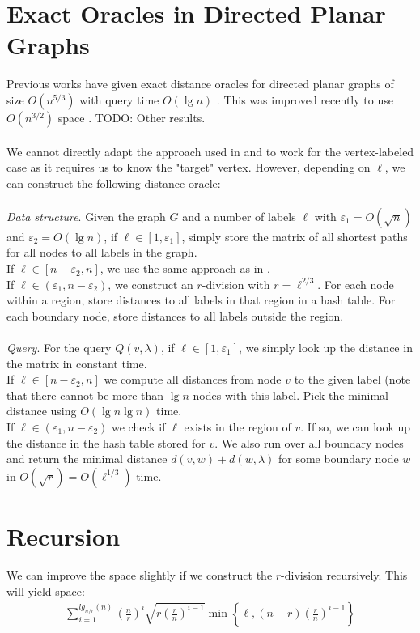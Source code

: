 \section{Exact Oracles in Directed Planar Graphs}
\label{sec:sota}
Previous works have given exact distance oracles for directed planar graphs of size
$O(n^{5/3})$ with query time $O(\lg n)$ \cite{cohen2017fast}. This was improved recently
to use $O(n^{3/2})$ space \cite{gawrychowski2017better}. TODO: Other results. \\
\\
We cannot directly adapt the approach used in \cite{cohen2017fast} and \cite{gawrychowski2017better} to work
for the vertex-labeled case as it requires us to know the "target" vertex. However,
depending on $\ell$, we can construct the following distance oracle:\\
\\
\textit{Data structure}. Given the graph $G$ and a number of labels $\ell$ with
$\varepsilon_1 = O(\sqrt{n})$ and $\varepsilon_2=O(\lg n)$, if $\ell\in
[1, \varepsilon_1]$, simply store the matrix of all shortest paths for all nodes to all
labels in the graph. \\
If $\ell\in [n-\varepsilon_2, n]$, we use the same approach as in
\cite{gawrychowski2017better}. \\
If $\ell\in (\varepsilon_1, n-\varepsilon_2)$, we construct an $r$-division with $r=\ell^{2/3}$. For each node within a region, store distances to all
labels in that region in a hash table. For each boundary node, store distances to all
labels outside the region. \\
\\
\textit{Query}. For the query $Q(v, \lambda)$, if $\ell\in[1, \varepsilon_1]$, we simply look up the distance in the matrix
in constant time. \\
If $\ell\in [n-\varepsilon_2, n]$ we compute all distances from node $v$ to the given label (note
that there cannot be more than $\lg n$ nodes with this label. Pick the minimal distance
using $O(\lg n\lg n)$ time. \\
If $\ell\in (\varepsilon_1, n-\varepsilon_2)$ we check if $\ell$ exists in the region of $v$. If so,
we can look up the distance in the hash table
stored for $v$. We also run over all boundary nodes and return the minimal distance
$d(v,w)+d(w,\lambda)$ for some boundary node $w$ in
$O(\sqrt{r})=O(\ell^{1/3})$ time. \\


\section{Recursion}
We can improve the space slightly if we construct the $r$-division recursively. This will
yield space:
\begin{align*}
  \sum_{i=1}^{lg_{n/r}(n)} \left(\frac{n}{r}\right)^i
  \sqrt{r\left(\frac{r}{n}\right)^{i-1}} \min
  \left\{\ell,\left(n-r\right)\left(\frac{r}{n}\right)^{i-1}\right\}
\end{align*}



